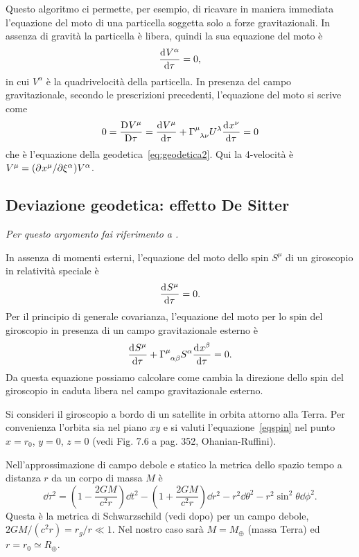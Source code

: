 Questo algoritmo ci permette, per esempio, di ricavare in maniera immediata
l'equazione del moto di una particella soggetta solo a forze gravitazionali.  In
assenza di gravità la particella è libera, quindi la sua equazione del moto è
\begin{equation}
  \frac{{\mathop{}\!\mathrm{d}^{}}V^{\alpha}}{\mathop{}\!\mathrm{d} {\tau}^{}} = 0,
\end{equation}
in cui $V^{\alpha}$ è la quadrivelocità della particella.  In
presenza del campo gravitazionale, secondo le prescrizioni precedenti,
l'equazione del moto si scrive come
\begin{equation}
  0 = \curder{V^{\mu}} = \toder{V^{\mu}}{\tau} +
  \tensor{\Gamma}{^{\mu}_{\lambda\nu}} U^{\lambda} \toder{x^{\nu}}{\tau} = 0
\end{equation}
che è l'equazione della
geodetica~\eqref{eq:geodetica2}.  Qui la 4-velocità è $V^{\mu} =
(\partial^{} x^{\mu} / \partial {\xi^{\alpha}}^{}) V^{\alpha}$.

\subsection{Deviazione geodetica: effetto De Sitter}
\label{sec:effetto-de-sitter}

\emph{Per questo argomento fai riferimento a
  \textcites[352-355]{ohanian:gravitazione}[233]{weinberg:gravitation}.}

In assenza di momenti esterni, l'equazione del moto dello spin $S^{\mu}$ di un
giroscopio in relatività speciale è
\begin{equation}
  \frac{{\mathop{}\!\mathrm{d}^{}}S^{\mu}}{\mathop{}\!\mathrm{d} {\tau}^{}} = 0.
\end{equation}
Per il principio di generale covarianza, l'equazione del moto per lo spin del
giroscopio in presenza di un campo gravitazionale esterno è
\begin{equation}
  \toder{S^{\mu}}{\tau} + \tensor{\Gamma}{^{\mu}_{\alpha\beta}} S^{\alpha}
  \toder{x^{\beta}}{\tau}= 0.
  \label{eqspin}
\end{equation}
Da questa equazione possiamo calcolare come cambia la direzione dello spin del
giroscopio in caduta libera nel campo gravitazionale esterno.

Si consideri il giroscopio a bordo di un satellite in orbita attorno alla Terra.
Per convenienza l'orbita sia nel piano $xy$ e si valuti
l'equazione~\eqref{eqspin} nel punto $x=r_0$, $y=0$, $z=0$ (vedi Fig. 7.6 a
pag. 352, Ohanian-Ruffini).

Nell'approssimazione di campo debole e statico la metrica dello spazio tempo a
distanza $r$ da un corpo di massa $M$ è
\begin{equation}
  \dd\tau^2 = \left(1-\frac{2 G M}{c^2r}\right) \dd t^2 - \left(1+\frac{2 G
      M}{c^2r}\right) \dd r^2 - r^2 \dd \theta^2 - r^2 \sin^2 \theta \dd \phi^2.
  \label{metricadebole}
\end{equation}
Questa è la metrica di Schwarzschild (vedi dopo) per un campo debole, $2GM/(c^2
r) = r_{g}/r\ll 1$.  Nel nostro caso sarà $M=M_{\oplus}$ (massa Terra) ed $r=
r_0 \simeq R_{\oplus}$.

